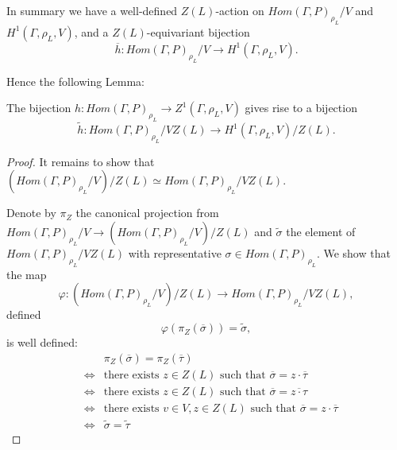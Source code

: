 In summary we have a well-defined $Z(L)$-action on $Hom(\Gamma, P)_{\rho_L}/V$ and $H^1(\Gamma, \rho_L, V)$, and a $Z(L)$-equivariant bijection 
\begin{displaymath}
  \overline{h}:Hom(\Gamma, P)_{\rho_L}/V \rightarrow H^1(\Gamma, \rho_L, V).
\end{displaymath}

Hence the following Lemma:

\begin{lemma}
  The bijection $h: Hom(\Gamma, P)_{\rho_L} \rightarrow Z^1(\Gamma, \rho_L, V)$ gives rise to a bijection
  \begin{displaymath}
    \tilde{h}: Hom(\Gamma, P)_{\rho_L}/VZ(L) \rightarrow H^1(\Gamma, \rho_L, V)/Z(L).
  \end{displaymath}
  \label{lem:vzl_h1zl}
\end{lemma}
\begin{proof}
  It remains to show that $\left(Hom(\Gamma, P)_{\rho_L}/V\right)/Z(L) \simeq Hom(\Gamma, P)_{\rho_L}/VZ(L)$.

  Denote by $\pi_Z$ the canonical projection from $Hom(\Gamma, P)_{\rho_L}/V \rightarrow \left( Hom(\Gamma, P)_{\rho_L}/V \right)/Z(L)$ and $\tilde{\sigma}$ the element of $Hom(\Gamma, P)_{\rho_L}/VZ(L)$ with representative $\sigma \in Hom(\Gamma, P)_{\rho_L}$. We show that the map
  \begin{displaymath}
    \varphi: (Hom(\Gamma, P)_{\rho_L}/V)/Z(L) \rightarrow Hom(\Gamma, P)_{\rho_L}/VZ(L),
  \end{displaymath}
  defined
  \begin{displaymath}
    \varphi(\pi_Z(\overline{\sigma})) = \tilde{\sigma},
  \end{displaymath}
  is well defined:
  \begin{eqnarray*}
    && \pi_Z(\overline{\sigma}) = \pi_Z(\overline{\tau}) \\
    &\Longleftrightarrow& \textrm{there exists } z \in Z(L) \textrm{ such that } \overline{\sigma} = z \cdot \overline{\tau} \\
    &\Longleftrightarrow& \textrm{there exists } z \in Z(L) \textrm{ such that } \overline{\sigma} = \overline{z \cdot \tau} \\
    &\Longleftrightarrow& \textrm{there exists } v \in V, z \in Z(L) \textrm{ such that } \overline{\sigma} = z \cdot \overline{\tau} \\
    &\Longleftrightarrow& \tilde{\sigma} = \tilde{\tau}
  \end{eqnarray*}
\end{proof}


